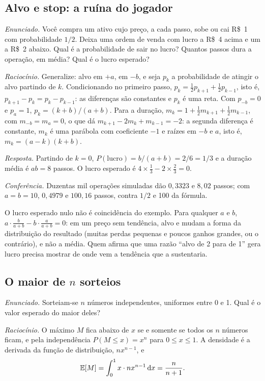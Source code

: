 \subsection{Alvo e stop: a ruína do jogador}

\emph{Enunciado.} Você compra um ativo cujo preço, a cada passo, sobe ou cai R\$~1 com probabilidade $1/2$. Deixa uma ordem de venda com lucro a R\$~4 acima e um  a R\$~2 abaixo. Qual é a probabilidade de sair no lucro? Quantos passos dura a operação, em média? Qual é o lucro esperado?

\emph{Raciocínio.} Generalize: alvo em $+a$,  em $-b$, e seja $p_k$ a probabilidade de atingir o alvo partindo de $k$. Condicionando no primeiro passo, $p_k = \frac12 p_{k+1} + \frac12 p_{k-1}$, isto é, $p_{k+1} - p_k = p_k - p_{k-1}$: as diferenças são constantes e $p_k$ é uma reta. Com $p_{-b} = 0$ e $p_a = 1$, $p_k = (k + b)/(a + b)$. Para a duração, $m_k = 1 + \frac12 m_{k+1} + \frac12 m_{k-1}$, com $m_{-b} = m_a = 0$, o que dá $m_{k+1} - 2m_k + m_{k-1} = -2$: a segunda diferença é constante, $m_k$ é uma parábola com coeficiente $-1$ e raízes em $-b$ e $a$, isto é, $m_k = (a - k)(k + b)$.

\emph{Resposta.} Partindo de $k = 0$, $P(\text{lucro}) = b/(a+b) = 2/6 = 1/3$ e a duração média é $ab = 8$ passos. O lucro esperado é $4 \times \frac13 - 2 \times \frac23 = 0$.

\emph{Conferência.} Duzentas mil operações simuladas dão $0,3323$ e $8,02$ passos; com $a = b = 10$, $0,4979$ e $100,16$ passos, contra $1/2$ e 100 da fórmula.

O lucro esperado nulo não é coincidência do exemplo. Para qualquer $a$ e $b$, $a \cdot \frac{b}{a+b} - b \cdot \frac{a}{a+b} = 0$: em um preço sem tendência, alvo e  mudam a forma da distribuição do resultado (muitas perdas pequenas e poucos ganhos grandes, ou o contrário), e não a média. Quem afirma que uma razão ``alvo de 2 para  de 1'' gera lucro precisa mostrar de onde vem a tendência que a sustentaria.

\subsection{O maior de \texorpdfstring{$n$}{n} sorteios}
\label{sec:c16-maximo}

\emph{Enunciado.} Sorteiam-se $n$ números independentes, uniformes entre 0 e 1. Qual é o valor esperado do maior deles?

\emph{Raciocínio.} O máximo $M$ fica abaixo de $x$ se e somente se todos os $n$ números ficam, e pela independência $P(M \le x) = x^n$ para $0 \le x \le 1$. A densidade é a derivada da função de distribuição, $n x^{n-1}$, e
\begin{equation*}
  \operatorname{\mathbb{E}}[M] = \int_0^1 x \cdot n x^{n-1}\mathop{}\!\mathrm{d} x = \frac{n}{n+1} .
\end{equation*}

